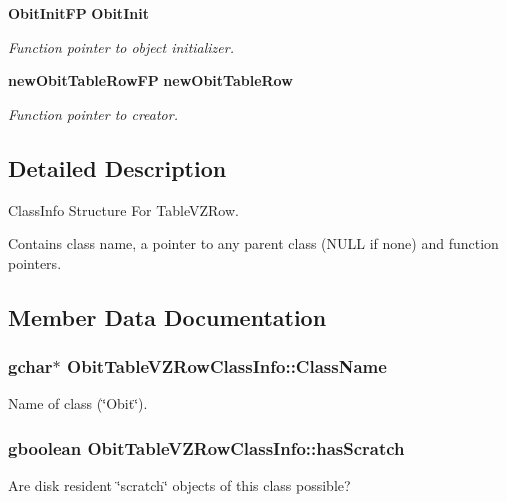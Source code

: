 \begin{CompactItemize}
{\bf Obit\-Init\-FP} {\bf Obit\-Init}
\begin{CompactList}\small\item\em Function pointer to object initializer. \item\end{CompactList}\item 
{\bf new\-Obit\-Table\-Row\-FP} {\bf new\-Obit\-Table\-Row}
\begin{CompactList}\small\item\em Function pointer to creator. \item\end{CompactList}\end{CompactItemize}


\subsection{Detailed Description}
Class\-Info Structure For Table\-VZRow. 

Contains class name, a pointer to any parent class (NULL if none) and function pointers. 



\subsection{Member Data Documentation}
\subsubsection{\setlength{\rightskip}{0pt plus 5cm}gchar$\ast$ {\bf Obit\-Table\-VZRow\-Class\-Info::Class\-Name}}\label{structObitTableVZRowClassInfo_o2}


Name of class (\char`\"{}Obit\char`\"{}). 

\subsubsection{\setlength{\rightskip}{0pt plus 5cm}gboolean {\bf Obit\-Table\-VZRow\-Class\-Info::has\-Scratch}}\label{structObitTableVZRowClassInfo_o1}


Are disk resident \char`\"{}scratch\char`\"{} objects of this class possible? 

